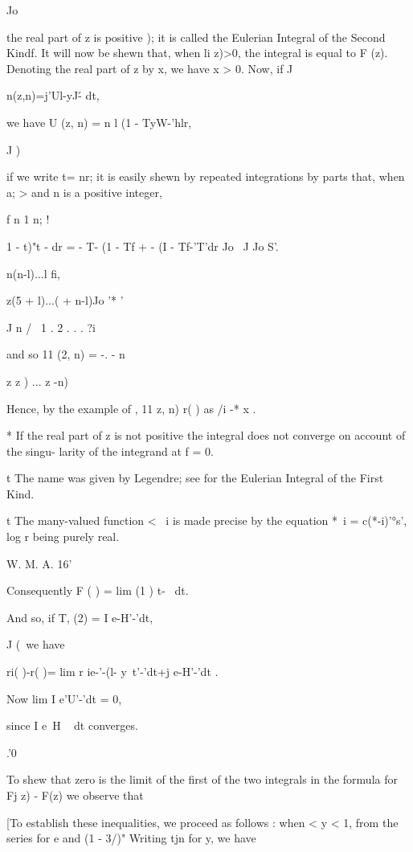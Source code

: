 Jo

the real part of z is positive ); it is called the Eulerian
Integral of the Second Kindf. It will now be shewn that, when li z)>0,
the integral is equal to F (z). Denoting the real part of z by x, we
have x > 0. Now, if J

n(z,n)=j'Ul-yJ\'- dt,

we have U (z, n) = n l (1 - TyW-'hlr,

J )

if we write t= nr; it is easily shewn by repeated integrations by
parts that, when a; > and n is a positive integer,

f n 1 n; !

 1 - t)"t - dr = - T- (1 - Tf + - (I - Tf-'T'dr Jo \ J Jo S'.

n(n-l)...l fi,

z(5 + l)...( + n-l)Jo '* '

J n / \ 1 . 2 . . . ?i

and so 11 (2, n) = -. - n

z z ) ... z -n)

Hence, by the example of , 11 z, n) r( ) as /i -* x .

* If the real part of z is not positive the integral does not converge
on account of the singu- larity of the integrand at f = 0.

t The name was given by Legendre; see  for the Eulerian
Integral of the First Kind.

t The many-valued function < ~i is made precise by the equation *~i =
c(*-i)'°s', log r being purely real.

W. M. A. 16'

%
%

Consequently F ( ) = lim (1 ) t-~ dt.

And so, if T, (2) = I e-H'-'dt,

J (\ we have

ri( )-r( )= lim r ie-'-(l- y\ t'-'dt+j e-H'-'dt .

Now lim I e'U'-'dt = 0,

since I e~H ~ dt converges.

.'0

To shew that zero is the limit of the first of the two integrals in
the formula for Fj z) - F(z) we observe that

[To establish these inequalities, we proceed as follows : when < y <
1, from the series for e and (1 - 3/)" Writing tjn for y, we have

